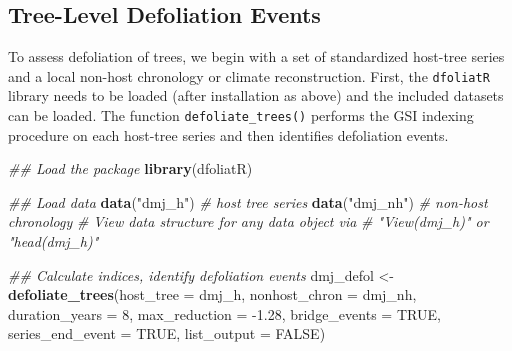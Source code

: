 \documentclass[review]{elsarticle} %
\newenvironment{Shaded}{\begin{snugshade}}{\end{snugshade}}
\newcommand{\CommentTok}[1]{\textcolor[rgb]{0.56,0.35,0.01}{\textit{#1}}}
\newcommand{\DataTypeTok}[1]{\textcolor[rgb]{0.13,0.29,0.53}{#1}}
\newcommand{\DecValTok}[1]{\textcolor[rgb]{0.00,0.00,0.81}{#1}}
\newcommand{\FloatTok}[1]{\textcolor[rgb]{0.00,0.00,0.81}{#1}}
\newcommand{\KeywordTok}[1]{\textcolor[rgb]{0.13,0.29,0.53}{\textbf{#1}}}
\newcommand{\NormalTok}[1]{#1}
\newcommand{\OtherTok}[1]{\textcolor[rgb]{0.56,0.35,0.01}{#1}}
\newcommand{\StringTok}[1]{\textcolor[rgb]{0.31,0.60,0.02}{#1}}
\begin{document}
\hypertarget{tree-level-defoliation-events}{%
\subsection{Tree-Level Defoliation Events}\label{tree-level-defoliation-events}}

To assess defoliation of trees, we begin with a set of standardized host-tree series and a local non-host chronology or climate reconstruction. First, the \texttt{dfoliatR} library needs to be loaded (after installation as above) and the included datasets can be loaded. The function \texttt{defoliate\_trees()} performs the GSI indexing procedure on each host-tree series and then identifies defoliation events.

\begin{Shaded}
\begin{Highlighting}[]
\CommentTok{## Load the package}
\KeywordTok{library}\NormalTok{(dfoliatR)}

\CommentTok{## Load data}
\KeywordTok{data}\NormalTok{(}\StringTok{"dmj_h"}\NormalTok{) }\CommentTok{# host tree series}
\KeywordTok{data}\NormalTok{(}\StringTok{"dmj_nh"}\NormalTok{) }\CommentTok{# non-host chronology}
\CommentTok{# View data structure for any data object via }
\CommentTok{# "View(dmj_h)" or "head(dmj_h)"}

\CommentTok{## Calculate indices, identify defoliation events}
\NormalTok{dmj_defol <-}\StringTok{ }\KeywordTok{defoliate_trees}\NormalTok{(}\DataTypeTok{host_tree =}\NormalTok{ dmj_h,}
                             \DataTypeTok{nonhost_chron =}\NormalTok{ dmj_nh,}
                             \DataTypeTok{duration_years =} \DecValTok{8}\NormalTok{,  }
                             \DataTypeTok{max_reduction =} \FloatTok{-1.28}\NormalTok{, }
                             \DataTypeTok{bridge_events =} \OtherTok{TRUE}\NormalTok{, }
                             \DataTypeTok{series_end_event =} \OtherTok{TRUE}\NormalTok{, }
                             \DataTypeTok{list_output =} \OtherTok{FALSE}\NormalTok{) }
\end{Highlighting}
\end{Shaded}
\end{document}
